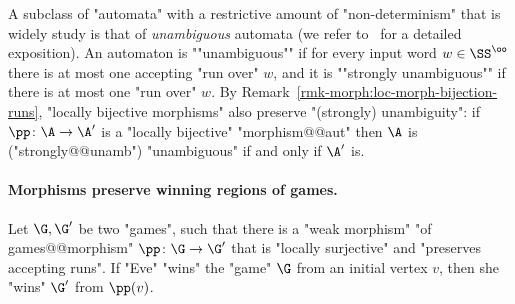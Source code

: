 \documentclass{theoretics}
\begin{document}
A subclass of "automata" with a restrictive amount of "non-determinism" that is widely study is that of \emph{unambiguous} automata (we refer to~\cite{Colcombet15Unambiguity, Carton2003UnambiguousBuchi} for a detailed exposition). An automaton is \AP""unambiguous"" if for every input word $w\in \SS^\oo$ there is at most one accepting "run over" $w$, and it is ""strongly unambiguous"" if there is at most one "run over" $w$. By Remark~\ref{rmk-morph:loc-morph-bijection-runs}, "locally bijective morphisms" also preserve "(strongly) unambiguity": if $\pp\colon \A \to \A'$ is a "locally bijective" "morphism@@aut" then $\A$ is ("strongly@@unamb") "unambiguous" if and only if  $\A'$ is.


\paragraph*{Morphisms preserve winning regions of games.}
\begin{lemma}\label{lemma-morph:surj-mappings-preserve-games}
	Let $\G, \G'$ be two "games", such that there is a "weak morphism" "of games@@morphism" $\pp\colon \G \to \G'$ that is "locally surjective" and "preserves accepting runs". If "Eve" "wins" the "game" $\G$ from an initial vertex $v$, then she "wins" $\G'$ from $\pp(v)$.
\end{lemma}
\end{document}
